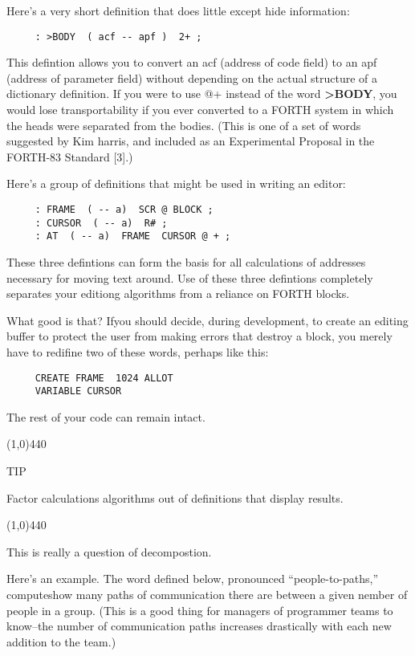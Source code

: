 \documentclass{book}
\begin{document}
Here's a very short definition that does little except hide information:

\begin{verbatim}
     : >BODY  ( acf -- apf )  2+ ;
\end{verbatim}


\noindent
This defintion allows you to convert an acf (address of code field) to an apf (address of parameter field) without depending on the actual structure of a dictionary definition. If you were to use @+ instead of the word \textbf{>BODY}, you would lose transportability if you ever converted to a FORTH system in which the heads were separated from the bodies. (This is one of a set of words suggested by Kim harris, and included as an Experimental Proposal in the FORTH-83 Standard [3].)

Here's a group of definitions that might be used in writing an editor:

\begin{verbatim}
     : FRAME  ( -- a)  SCR @ BLOCK ;
     : CURSOR  ( -- a)  R# ;
     : AT  ( -- a)  FRAME  CURSOR @ + ;
\end{verbatim}

\noindent
These three defintions can form the basis for all calculations of addresses necessary for moving text around. Use of these three defintions completely separates your editiong algorithms from a reliance on FORTH blocks.

What good is that? Ifyou should decide, during development, to create an editing buffer to protect the user from making errors that destroy a block, you merely have to redifine two of these words, perhaps like this:

\begin{verbatim}
     CREATE FRAME  1024 ALLOT
     VARIABLE CURSOR
\end{verbatim}

\noindent
The rest of your code can remain intact. 

\line(1,0){440}

TIP

Factor calculations algorithms out of definitions that display results.

\line(1,0){440}

\bigskip

\noindent
This is really a question of decompostion.

Here's an example. The word defined below, pronounced ``people-to-paths,'' computeshow many paths of communication there are between a given nember of people in a group. (This is a good thing for managers of programmer teams to know--the number of communication paths increases drastically with each new addition to the team.)
\end{document}
